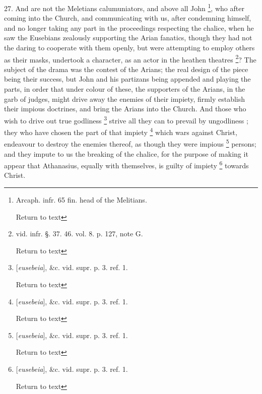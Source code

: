 27. And are not the Meletians calumuniators, and
above all John \footnote{Arcaph. infr. 65 fin. head of the Melitians.

Return to text}, who
after coming into the Church, and communicating with us, after
condemning himself, and no longer taking any part in the proceedings
respecting the chalice, when he saw the Eusebians zealously supporting
the Arian fanatics, though they had not the daring to cooperate with
them openly, but were attempting to employ others as their masks,
undertook a character, as an actor in the heathen theatres \footnote{vid. infr. §. 37. 46. vol. 8. p. 127, note G.

Return to text}? The subject of the drama was the contest of the Arians;
the real design of the piece being their success, but John and his
partizans being appended and playing the parts, in order that under
colour of these, the supporters of the Arians, in the garb of judges,
might drive away the enemies of their impiety, firmly establish their
impious doctrines, and bring the Arians into the Church. And those who
wish to drive out true godliness \footnote{[\emph{eusebeia}], \&c. vid. supr. p. 3. ref. 1.

Return to text} strive all they can to prevail by ungodliness ; they
who have chosen the part of that impiety \footnote{[\emph{eusebeia}], \&c. vid. supr. p. 3. ref. 1.

Return to text}
which wars against Christ, endeavour to destroy the enemies thereof,
as though they were impious \footnote{[\emph{eusebeia}], \&c. vid. supr. p. 3. ref. 1.

Return to text} persons;
and they impute to us the breaking of the chalice, for the purpose of
making it appear that Athanasius, equally with themselves, is guilty
of impiety \footnote{[\emph{eusebeia}], \&c. vid. supr. p. 3. ref. 1.

Return to text} towards Christ.

